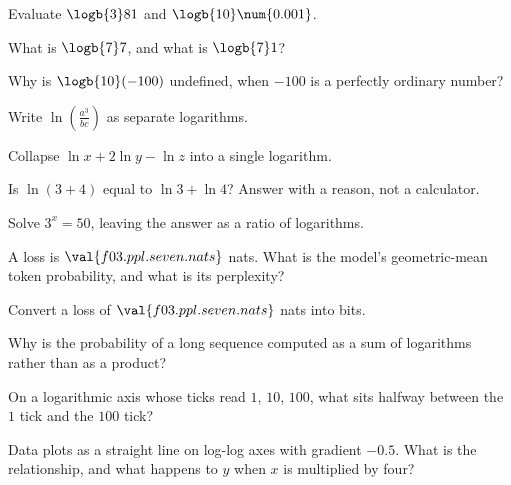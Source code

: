 \begin{testexercises}
\item Evaluate $\logb{3} 81$ and $\logb{10} \num{0.001}$.
\item What is $\logb{7} 7$, and what is $\logb{7} 1$?
\item Why is $\logb{10}(-100)$ undefined, when $-100$ is a perfectly ordinary
  number?
\item Write $\ln\!\left(\frac{a^{3}}{bc}\right)$ as separate logarithms.
\item Collapse $\ln x + 2\ln y - \ln z$ into a single logarithm.
\item Is $\ln(3 + 4)$ equal to $\ln 3 + \ln 4$? Answer with a reason, not a
  calculator.
\item Solve $3^{x} = 50$, leaving the answer as a ratio of logarithms.
\item A loss is $\val{f03.ppl.seven.nats}$ nats. What is the model's
  geometric-mean token probability, and what is its perplexity?
\item Convert a loss of $\val{f03.ppl.seven.nats}$ nats into bits.
\item Why is the probability of a long sequence computed as a sum of
  logarithms rather than as a product?
\item On a logarithmic axis whose ticks read $1$, $10$, $100$, what sits
  halfway between the $1$ tick and the $100$ tick?
\item Data plots as a straight line on log-log axes with gradient $-\num{0.5}$.
  What is the relationship, and what happens to $y$ when $x$ is multiplied by
  four?
\end{testexercises}

